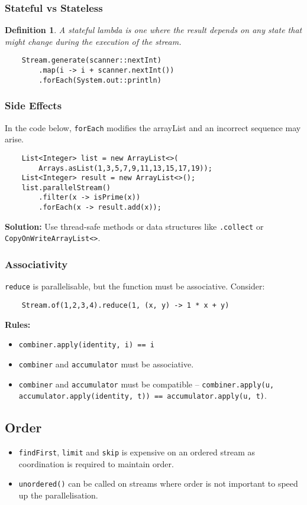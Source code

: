 \documentclass[10pt,landscape,a4paper]{article}
\newtheorem{definition}{Definition}[section]
\begin{document}
\begin{multicols*}{4}
\subsubsection{Stateful vs Stateless}
\begin{definition}
    A stateful lambda is one where the result depends on any state that might change during the execution of the stream.
\end{definition}

\begin{lstlisting}
    Stream.generate(scanner::nextInt)
        .map(i -> i + scanner.nextInt())
        .forEach(System.out::println)
\end{lstlisting}
\subsubsection{Side Effects}
In the code below, \texttt{forEach} modifies the arrayList and an incorrect sequence may arise.
\begin{lstlisting}
    List<Integer> list = new ArrayList<>(
        Arrays.asList(1,3,5,7,9,11,13,15,17,19));
    List<Integer> result = new ArrayList<>();
    list.parallelStream()
        .filter(x -> isPrime(x))
        .forEach(x -> result.add(x));
\end{lstlisting}
\textbf{Solution:} Use thread-safe methods or data structures like \texttt{.collect} or \texttt{CopyOnWriteArrayList<>}.
\subsubsection{Associativity}
\texttt{reduce} is parallelisable, but the function must be associative. Consider:
\begin{lstlisting}
    Stream.of(1,2,3,4).reduce(1, (x, y) -> 1 * x + y)
\end{lstlisting}
\textbf{Rules:}
\begin{itemize}
    \item \texttt{combiner.apply(identity, i) == i}
    \item \texttt{combiner} and \texttt{accumulator} must be associative.
    \item \texttt{combiner} and \texttt{accumulator} must be compatible -- \texttt{combiner.apply(u, accumulator.apply(identity, t)) == accumulator.apply(u, t)}.
\end{itemize}

\subsection{Order}
\begin{itemize}
    \item \texttt{findFirst}, \texttt{limit} and \texttt{skip} is expensive on an ordered stream as coordination is required to maintain order. \\
    \item \texttt{unordered()} can be called on streams where order is not important to speed up the parallelisation.
\end{itemize}


\end{multicols*}
\end{document}
